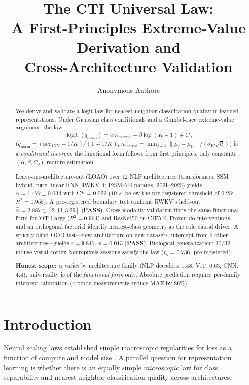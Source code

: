 \documentclass{article}
\title{The CTI Universal Law:\\
A First-Principles Extreme-Value Derivation and\\
Cross-Architecture Validation}
\author{Anonymous Authors} \\
\DeclareMathOperator{\logit}{logit}
\begin{document}
\ifcolmsubmission
\linenumbers
\fi
\maketitle

\begin{abstract}
We derive and validate a logit law for nearest-neighbor classification quality in learned representations.
Under Gaussian class conditionals and a Gumbel-race extreme-value argument, the law
\begin{equation*}
\logit(q_{\mathrm{norm}})=\alpha\,\kappa_{\mathrm{nearest}}-\beta\log(K-1)+C_0
\end{equation*}
($q_{\mathrm{norm}}=(\mathrm{acc}_{1\mathrm{NN}}-1/K)/(1-1/K)$, $\kappa_{\mathrm{nearest}}=\min_{j\neq k}\|\mu_j-\mu_k\|/(\sigma_W\sqrt{d})$)
is a \emph{conditional theorem}: the functional form follows from first principles; only constants $(\alpha,\beta,C_0)$ require estimation.

Leave-one-architecture-out (LOAO) over 12 NLP architectures (transformers, SSM hybrid, pure linear-RNN RWKV-4; 125M--7B params, 2021--2025) yields $\hat\alpha=1.477\pm0.034$ with CV$=0.023$ ($10{\times}$ below the pre-registered threshold of 0.25; $R^2=0.955$).
A pre-registered boundary test confirms RWKV's held-out $\hat\alpha=2.887\in[2.43,3.29]$ (\textbf{PASS}).
Cross-modality validation finds the same functional form for ViT-Large ($R^2=0.964$) and ResNet50 on CIFAR.
Frozen do-interventions and an orthogonal factorial identify nearest-class geometry as the sole causal driver.
A strictly blind OOD test---new architecture on new datasets, intercept from 6 other architectures---yields $r=0.817$, $p=0.013$ (\textbf{PASS}).
Biological generalization: 30/32 mouse visual-cortex Neuropixels sessions satisfy the law ($\bar{r}_\kappa=0.736$, pre-registered).

\textbf{Honest scope:} $\alpha$ varies by architecture family (NLP decoders: 1.48, ViT: 0.63, CNN: 4.4); universality is of the \emph{functional form} only.
Absolute prediction requires per-family intercept calibration (4 probe measurements reduce MAE by 86\%).
\end{abstract}

\section{Introduction}
Neural scaling laws established simple macroscopic regularities for loss as a function of compute and model size \citep{kaplan2020,hoffmann2022}. A parallel question for representation learning is whether there is an equally simple \emph{microscopic} law for class separability and nearest-neighbor classification quality across architectures.
\end{document}
